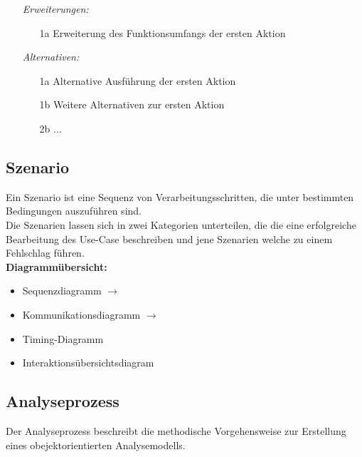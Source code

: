 \begin{description}[leftmargin=2.5cm]
\begin{itemize}[leftmargin=4cm]
        \item[\textit{Erweiterungen:}]
          \begin{enumerate}[leftmargin=0.5cm]
            \item[1a] Erweiterung des Funktionsumfangs der ersten Aktion
          \end{enumerate}
        \item[\textit{Alternativen:}]
          \begin{enumerate}[leftmargin=0.5cm]
            \item[1a] Alternative Ausführung der ersten Aktion
            \item[1b] Weitere Alternativen zur ersten Aktion
            \item[2b] ...
          \end{enumerate}
      \end{itemize}
	\end{description}

	\subsection{Szenario }
  		Ein Szenario ist eine Sequenz von Verarbeitungsschritten, die unter bestimmten
  		Bedingungen auszuführen sind.\\
  		Die Szenarien lassen sich in zwei Kategorien unterteilen, die die eine erfolgreiche Bearbeitung
  des Use-Case beschreiben und jene Szenarien welche zu einem Fehlschlag führen. \\
  
  \textbf{Diagrammübersicht:}
  \begin{multicols}{2}
  	\begin{itemize}[leftmargin=0.5cm]
    	\item Sequenzdiagramm $\rightarrow$ 
    	\item Kommunikationsdiagramm $\rightarrow$ 
    	\item Timing-Diagramm
    	\item Interaktionsübersichtsdiagram
  	\end{itemize}
  \end{multicols}
  
\subsection{Analyseprozess }
  Der Analyseprozess beschreibt die methodische Vorgehensweise zur Erstellung eines
  obejektorientierten Analysemodells.\\
  
